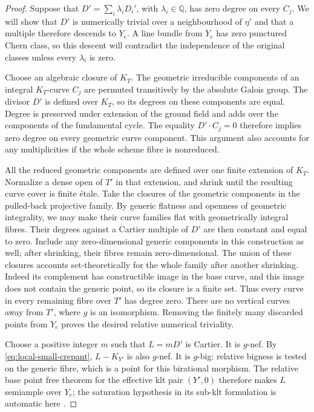 \begin{proof}
Suppose that
$D'=\sum_i\lambda_iD_i'$, with $\lambda_i\in\mathbb Q$, has zero
degree on every $C_j$.  We will show that $D'$ is numerically trivial
over a neighbourhood of $\eta'$ and that a multiple therefore
descends to $Y_e$.  A line bundle from $Y_e$ has zero punctured Chern
class, so this descent will contradict the independence of the
original classes unless every $\lambda_i$ is zero.

Choose an algebraic closure of $K_T$.  The geometric irreducible
components of an integral $K_T$-curve $C_j$ are permuted transitively
by the absolute Galois group.  The divisor $D'$ is defined over
$K_T$, so its degrees on these components are equal.  Degree is
preserved under extension of the ground field and adds over the
components of the fundamental cycle.  The equality
$D'\cdot C_j=0$ therefore implies zero degree on every geometric
curve component.  This argument also accounts for any multiplicities
if the whole scheme fibre is nonreduced.

All the reduced geometric components are defined over one finite
extension of $K_T$.  Normalize a dense open of $T'$ in that
extension, and shrink until the resulting curve cover is finite
\'etale.  Take the closures of the geometric
components in the pulled-back projective family.  By generic
flatness and openness of geometric integrality, we may make their
curve families flat with geometrically integral fibres.  Their
degrees against a Cartier multiple of $D'$ are then constant and
equal to zero.  Include any zero-dimensional generic components in
this construction as well; after shrinking, their fibres remain
zero-dimensional.  The union of these closures accounts
set-theoretically for the whole family after another shrinking.
Indeed its complement has constructible image in the base curve,
and this image does not contain the generic point, so its closure
is a finite set.  Thus every curve in every remaining fibre over
$T'$ has degree zero.  There are no vertical curves away from $T'$,
where $g$ is an isomorphism.  Removing the finitely many discarded
points from $Y_e$ proves the desired relative numerical triviality.

Choose a positive integer $m$ such that $L=mD'$ is Cartier.  It is
$g$-nef.  By \eqref{eq:local-small-crepant}, $L-K_{Y'}$ is also
$g$-nef.  It is $g$-big: relative bigness is tested on the generic
fibre, which is a point for this birational morphism.  The relative
base point free theorem for the effective klt pair $(Y',0)$ therefore
makes $L$ semiample over $Y_e$; the saturation hypothesis in its
sub-klt formulation is automatic here
\cite[Theorem~2.1 and Remark~3.16]{FujinoBPF}.


\end{proof}
